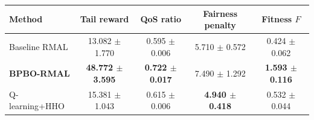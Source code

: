 \begin{tabular}{lcccc}
\hline
\textbf{Method} & \textbf{Tail reward} & \textbf{QoS ratio} & \textbf{Fairness penalty} & \textbf{Fitness $F$} \\
\hline
Baseline RMAL & 13.082 $\pm$ 1.770 & 0.595 $\pm$ 0.006 & 5.710 $\pm$ 0.572 & 0.424 $\pm$ 0.062 \\
\textbf{BPBO-RMAL} & \textbf{48.772 $\pm$ 3.595} & \textbf{0.722 $\pm$ 0.017} & 7.490 $\pm$ 1.292 & \textbf{1.593 $\pm$ 0.116} \\
Q-learning+HHO & 15.381 $\pm$ 1.043 & 0.615 $\pm$ 0.006 & \textbf{4.940 $\pm$ 0.418} & 0.532 $\pm$ 0.044 \\
\hline
\end{tabular}